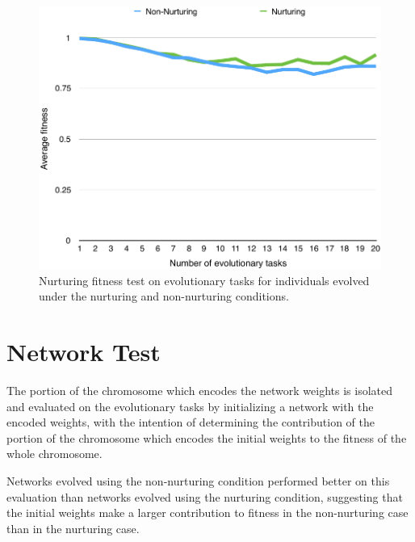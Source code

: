 \documentclass[master]{outhesis}
\begin{document}
\begin{figure}[H]
	\centering
	\includegraphics{NurturingFitnessTestPlot.pdf}
	\caption{Nurturing fitness test on evolutionary tasks for individuals evolved under the nurturing and non-nurturing conditions.}
\end{figure}

\section{Network Test}

The portion of the chromosome which encodes the network weights is isolated and evaluated on the evolutionary tasks by initializing a network with the encoded weights, with the intention of determining the contribution of the portion of the chromosome which encodes the initial weights to the fitness of the whole chromosome.

Networks evolved using the non-nurturing condition performed better on this evaluation than networks evolved using the nurturing condition, suggesting that the initial weights make a larger contribution to fitness in the non-nurturing case than in the nurturing case.
\end{document}
